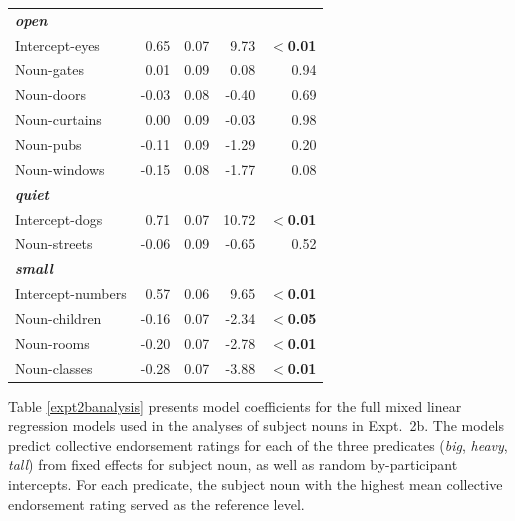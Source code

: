 \documentclass[preprint,12pt,authoryear,titlepage]{elsarticle}
\begin{document}
\begin{table}[htb]
\begin{tabular}{lrrrr}
		\emph{\textbf{open}}\\
		Intercept-eyes	& 	0.65	&	0.07	&	9.73	&	\textbf{$<$0.01} \\
		Noun-gates	&	0.01	&   0.09	&	0.08	&	0.94 \\
		Noun-doors	&	-0.03	&   0.08	&	-0.40	&	0.69 \\
		Noun-curtains	&	0.00	&   0.09	&	-0.03	&	0.98 \\
		Noun-pubs	&	-0.11	&   0.09 	&	-1.29	&	0.20 \\
		Noun-windows	&	-0.15	&   0.08	&	-1.77	&	0.08 \\\hline
		\emph{\textbf{quiet}}\\
		Intercept-dogs	& 	0.71	&	0.07	&	10.72	&	\textbf{$<$0.01} \\
		Noun-streets	&	-0.06	&   0.09	&	-0.65	&	0.52 \\\hline
		\emph{\textbf{small}}\\
		Intercept-numbers	& 	0.57	&	0.06	&	9.65	&	\textbf{$<$0.01} \\
		Noun-children	&	-0.16	&   0.07	&	-2.34	&	\textbf{$<$0.05} \\
		Noun-rooms	&	-0.20	&   0.07	&	-2.78	&	\textbf{$<$0.01} \\
		Noun-classes	&	-0.28	&   0.07	&	-3.88	&	\textbf{$<$0.01} \\
		\bottomrule
	\end{tabular}
\end{table}

Table \ref{expt2banalysis} presents model coefficients for the full mixed linear regression models used in the analyses of subject nouns in Expt.~2b. The models predict collective endorsement ratings for each of the three predicates (\emph{big}, \emph{heavy}, \emph{tall}) from fixed effects for subject noun, as well as random by-participant intercepts. For each predicate, the subject noun with the highest mean collective endorsement rating served as the reference level.
\end{document}
